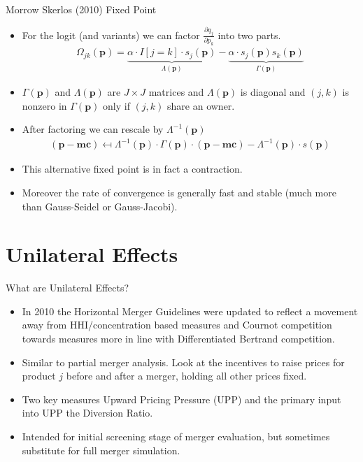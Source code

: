 \documentclass[xcolor=pdftex,dvipsnames,table,mathserif]{beamer}
\begin{document}
\begin{frame}{Morrow Skerlos (2010) Fixed Point}
\begin{itemize}
\item For the logit (and variants) we can factor $\frac{\partial q_j}{\partial p_k}$ into two parts. 
\begin{eqnarray*}
\Omega_{jk}(\mathbf{p}) =  \underbrace{\alpha \cdot I[j=k] \cdot s_j(\mathbf{p})}_{\Lambda(\mathbf{p})} -  \underbrace{\alpha \cdot s_{j}(\mathbf{p}) s_{k}(\mathbf{p})}_{\Gamma(\mathbf{p})}
\end{eqnarray*}
\item $\Gamma(\mathbf{p})$ and $\Lambda(\mathbf{p})$ are $J \times J$ matrices and $\Lambda(\mathbf{p})$ is diagonal and $(j,k)$ is nonzero in $\Gamma(\mathbf{p})$ only if $(j,k)$ share an owner.
\item After factoring we can rescale by $\Lambda^{-1} (\mathbf{p})$
\begin{eqnarray*}
(\mathbf{p}-\mathbf{mc} ) \mapsfrom \Lambda^{-1}(\mathbf{p}) \cdot \Gamma(\mathbf{p})\cdot(\mathbf{p}- \mathbf{mc}) - \Lambda^{-1}(\mathbf{p})\cdot s(\mathbf{p})
\end{eqnarray*}
\item This alternative fixed point is in fact a contraction.
\item Moreover the rate of convergence is generally fast and stable (much more than Gauss-Seidel or Gauss-Jacobi).
\end{itemize}
\end{frame}


\section{Unilateral Effects}

\begin{frame}{What are Unilateral Effects?}
\begin{itemize}
\item In 2010 the Horizontal Merger Guidelines were updated to reflect a movement away from HHI/concentration based measures and \alert{Cournot} competition towards measures more in line with \alert{Differentiated Bertrand} competition.
\item Similar to partial merger analysis. Look at the incentives to raise prices for product $j$ before and after a merger, holding all other prices fixed.
\item Two key measures \alert{Upward Pricing Pressure} (UPP) and the primary input into UPP the \alert{Diversion Ratio}.
\item Intended for initial screening stage of merger evaluation, but sometimes substitute for full merger simulation.
\end{itemize}
\end{frame}
\end{document}
